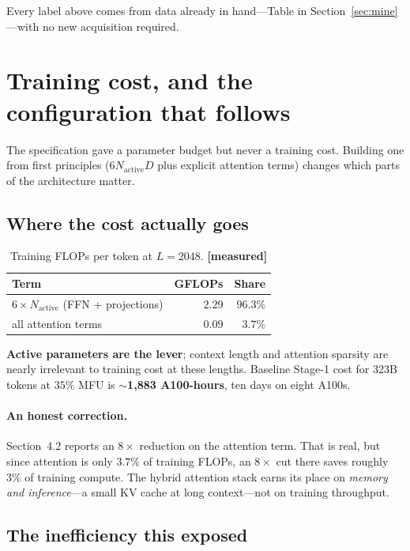 \documentclass[11pt,a4paper]{article}
\newcommand{\meas}{\textcolor{measured}{\textbf{[measured]}}}
\begin{document}
Every label above comes from data already in hand---Table in
Section~\ref{sec:mine}---with no new acquisition required.

\section{Training cost, and the configuration that follows}
\label{sec:cost}

The specification gave a parameter budget but never a training cost. Building one
from first principles ($6 N_{\text{active}} D$ plus explicit attention terms)
changes which parts of the architecture matter.

\subsection{Where the cost actually goes}

\begin{table}[h]
\centering
\caption{Training FLOPs per token at $L=2048$. \meas}
\small
\begin{tabular}{@{}lrr@{}}
\toprule
\textbf{Term} & \textbf{GFLOPs} & \textbf{Share} \\
\midrule
$6 \times N_{\text{active}}$ (FFN + projections) & $2.29$ & $\mathbf{96.3\%}$ \\
all attention terms & $0.09$ & $3.7\%$ \\
\bottomrule
\end{tabular}
\end{table}

\textbf{Active parameters are the lever}; context length and attention sparsity
are nearly irrelevant to training cost at these lengths. Baseline Stage-1 cost
for 323B tokens at $35\%$ MFU is \textbf{$\sim$1{,}883 A100-hours}, ten days on
eight A100s.

\paragraph{An honest correction.} Section~4.2 reports an $8\times$ reduction on
the attention term. That is real, but since attention is only $3.7\%$ of training
FLOPs, an $8\times$ cut there saves roughly $3\%$ of training compute. The hybrid
attention stack earns its place on \emph{memory and inference}---a small KV cache
at long context---not on training throughput.

\subsection{The inefficiency this exposed}
\end{document}
